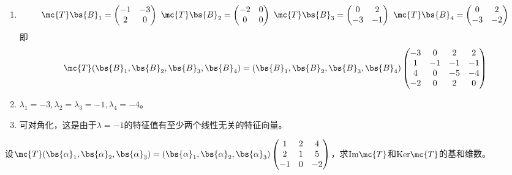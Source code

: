 \documentclass[12pt, a4paper, oneside, UTF8]{ctexbook}
\begin{document}
\begin{solution}
    \begin{enumerate}[label=(\arabic{*})]
        \item 
        \begin{align*}
            \mc{T}\bs{B}_1=\begin{pmatrix}
                -1&-3\\
                2&0
            \end{pmatrix}\ 
            \mc{T}\bs{B}_2=\begin{pmatrix}
               -2&0\\
               0&0 
            \end{pmatrix}\ 
            \mc{T}\bs{B}_3=\begin{pmatrix}
                0&2\\
                -3&-1 
             \end{pmatrix}\ 
             \mc{T}\bs{B}_4=\begin{pmatrix}
                0&2\\
                -3&-2 
             \end{pmatrix}
        \end{align*}
        即
        \begin{align*}
            \mc{T}(\bs{B}_1,\bs{B}_2,\bs{B}_3,\bs{B}_4)=(\bs{B}_1,\bs{B}_2,\bs{B}_3,\bs{B}_4)
            \begin{pmatrix}
                -3& 0&2&2  \\
                1 & -1&-1 &-1 \\
                4& 0& -5& -4\\
                -2& 0& 2&0
            \end{pmatrix}
        \end{align*}
        \item $\lambda_1=-3,\lambda_2=\lambda_3=-1,\lambda_4=-4$。
        \item 可对角化，这是由于$\lambda=-1$的特征值有至少两个线性无关的特征向量。
    \end{enumerate}
\end{solution}


\begin{question}
    设$\mc{T}(\bs{\alpha}_1,\bs{\alpha}_2,\bs{\alpha}_3)=(\bs{\alpha}_1,\bs{\alpha}_2,\bs{\alpha}_3)
    \begin{pmatrix}
        1&2&4\\
        2&1&5\\
        -1&0&-2
    \end{pmatrix}$，求$\mathrm{Im}\mc{T}$和$\mathrm{Ker}\mc{T}$的基和维数。
\end{question}
\end{document}
